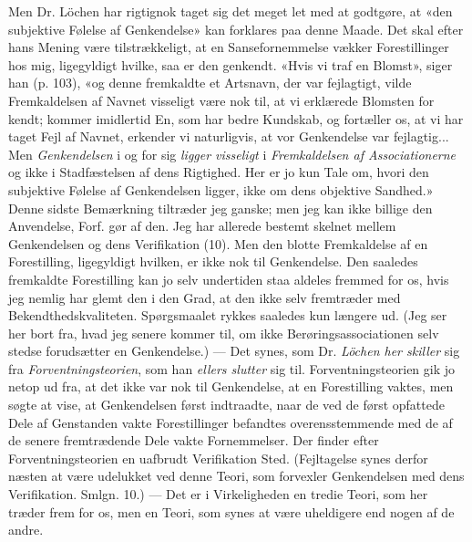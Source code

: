 \documentclass[12pt,a4paper,openany]{book}
\newcommand{\opage}[1]{\marginnote{\footnotesize\textit{[#1]}}}
\begin{document}
Men Dr. Löchen har rigtignok taget sig det meget let med at godtgøre, at «den
subjektive Følelse af Genkendelse» kan forklares paa denne Maade. Det skal
efter hans Mening være tilstrækkeligt, at en Sansefornemmelse vækker
Forestillinger hos mig, ligegyldigt hvilke, saa er den genkendt. «Hvis vi traf
en Blomst», siger han (p. 103), «og denne fremkaldte et Artsnavn, der var
fejlagtigt, vilde Fremkaldelsen af Navnet visseligt være nok til, at vi
erklærede Blomsten for kendt; kommer imidlertid En, som har bedre Kundskab, og
fortæller os, at vi har taget Fejl af Navnet, erkender vi naturligvis, at vor
Genkendelse var fejlagtig... Men \emph{Genkendelsen} i og for sig \emph{ligger
visseligt} i \emph{Fremkaldelsen af Associationerne} og ikke i Stadfæstelsen af
dens Rigtighed. Her er jo kun Tale om, hvori den subjektive Følelse af
Genkendelsen ligger, ikke om dens objektive Sandhed.» Denne sidste Bemærkning
tiltræder jeg ganske; men jeg kan ikke billige den Anvendelse, Forf. gør af
den. Jeg har allerede bestemt skelnet mellem Genkendelsen og dens Verifikation
(10). Men den blotte Fremkaldelse af en Forestilling, ligegyldigt hvilken, er
ikke nok til Genkendelse. Den saaledes fremkaldte Forestilling kan jo selv
undertiden staa aldeles fremmed for os, hvis jeg nemlig har glemt den i den
Grad, at den ikke selv fremtræder med Bekendthedskvaliteten. Spørgsmaalet
rykkes saaledes kun længere ud. (Jeg ser her bort fra, hvad jeg senere kommer
til, om ikke Berøringsassociationen selv stedse forudsætter en Genkendelse.)
--- Det synes, som Dr. \emph{Löchen her skiller} sig fra
\emph{Forventningsteorien}, som han \emph{ellers slutter} sig til.
Forventningsteorien gik jo netop ud fra, at det ikke var nok til Genkendelse,
at en Forestilling vaktes, men søgte at vise, at Genkendelsen først indtraadte,
naar de ved de først opfattede Dele af Genstanden vakte Forestillinger
befandtes overensstemmende med de af de senere
\setcounter{footnote}{0}%
\opage{27}fremtrædende Dele vakte Fornemmelser. Der finder efter
Forventningsteorien en uafbrudt Verifikation Sted. (Fejltagelse synes derfor
næsten at være udelukket ved denne Teori, som forvexler Genkendelsen med dens
Verifikation. Smlgn. 10.) --- Det er i Virkeligheden en tredie Teori, som her
træder frem for os, men en Teori, som synes at være uheldigere end nogen af de andre.
\end{document}
